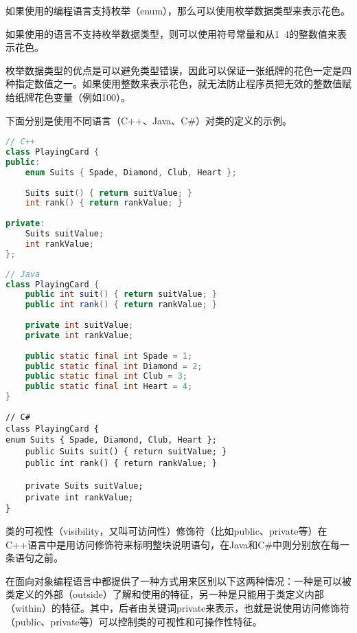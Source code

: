 \begin{compactitem}
\item 如果使用的编程语言支持枚举（enum），那么可以使用枚举数据类型来表示花色。
\item 如果使用的语言不支持枚举数据类型，则可以使用符号常量和从1~4的整数值来表示花色。
\end{compactitem}


枚举数据类型的优点是可以避免类型错误，因此可以保证一张纸牌的花色一定是四种指定数值之一。如果使用整数来表示花色，就无法防止程序员把无效的整数值赋给纸牌花色变量（例如100）。



下面分别是使用不同语言（C++、Java、C\#）对类的定义的示例。

\begin{lstlisting}[language=C++]
// C++
class PlayingCard {
public:
	enum Suits { Spade, Diamond, Club, Heart };
	
	Suits suit() { return suitValue; }
	int rank() { return rankValue; }
	
private:
	Suits suitValue;
	int rankValue;
};
\end{lstlisting}



\begin{lstlisting}[language=Java]
// Java 
class PlayingCard {
	public int suit() { return suitValue; }
	public int rank() { return rankValue; }
	
	private int suitValue;
	private int rankValue;
	
	public static final int Spade = 1;
	public static final int Diamond = 2;
	public static final int Club = 3;
	public static final int Heart = 4;
}
\end{lstlisting}



\begin{lstlisting}[language={[Sharp]C}]
// C#
class PlayingCard {
enum Suits { Spade, Diamond, Club, Heart };
	public Suits suit() { return suitValue; }
	public int rank() { return rankValue; }
	
	private Suits suitValue;
	private int rankValue;
}
\end{lstlisting}


类的可视性（visibility，又叫可访问性）修饰符（比如public、private等）在C++语言中是用访问修饰符来标明整块说明语句，在Java和C\#中则分别放在每一条语句之前。

在面向对象编程语言中都提供了一种方式用来区别以下这两种情况：一种是可以被类定义的外部（outside）了解和使用的特征，另一种是只能用于类定义内部（within）的特征。其中，后者由关键词private来表示，也就是说使用访问修饰符（public、private等）可以控制类的可视性和可操作性特征。


